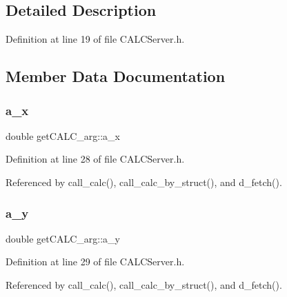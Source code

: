 \subsection{Detailed Description}


Definition at line 19 of file C\+A\+L\+C\+Server.\+h.



\subsection{Member Data Documentation}
\mbox{\label{structget_c_a_l_c__arg_a9a53c477664df2652be5b177a24653e9}} 
\subsubsection{\texorpdfstring{a\+\_\+x}{a\_x}}
{\footnotesize\ttfamily double get\+C\+A\+L\+C\+\_\+arg\+::a\+\_\+x}



Definition at line 28 of file C\+A\+L\+C\+Server.\+h.



Referenced by call\+\_\+calc(), call\+\_\+calc\+\_\+by\+\_\+struct(), and d\+\_\+fetch().

\mbox{\label{structget_c_a_l_c__arg_a15a1e316c1b2535d6867a74fee50a505}} 
\subsubsection{\texorpdfstring{a\+\_\+y}{a\_y}}
{\footnotesize\ttfamily double get\+C\+A\+L\+C\+\_\+arg\+::a\+\_\+y}



Definition at line 29 of file C\+A\+L\+C\+Server.\+h.



Referenced by call\+\_\+calc(), call\+\_\+calc\+\_\+by\+\_\+struct(), and d\+\_\+fetch().

\mbox{\label{structget_c_a_l_c__arg_a29cb8c4ed111c1dad4f3c2a51e5bec36}} 
